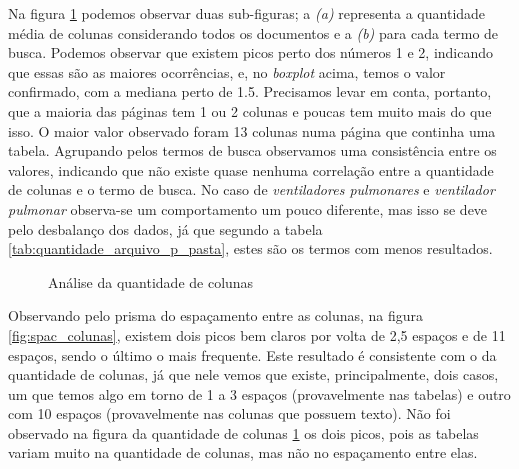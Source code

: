 \documentclass[10pt, a4paper]{article}
\begin{document}
Na figura \ref{fig:qtd_colunas} podemos observar duas sub-figuras; a \emph{(a)} representa a quantidade média de colunas considerando todos os documentos e a \emph{(b)} para cada termo de busca. Podemos observar que existem picos perto dos números 1 e 2, indicando que essas são as maiores ocorrências, e, no \textit{boxplot} acima, temos o valor confirmado, com a mediana perto de 1.5. Precisamos levar em conta, portanto, que a maioria das páginas tem 1 ou 2 colunas e poucas tem muito mais do que isso. O maior valor observado foram 13 colunas numa página que continha uma tabela. Agrupando pelos termos de busca observamos uma consistência entre os valores, indicando que não existe quase nenhuma correlação entre a quantidade de colunas e o termo de busca. No caso de \emph{ventiladores pulmonares} e \emph{ventilador pulmonar} observa-se um comportamento um pouco diferente, mas isso se deve pelo desbalanço dos dados, já que segundo a tabela \ref{tab:quantidade_arquivo_p_pasta}, estes são os termos com menos resultados.

\begin{figure}[H]
    \centering
    \hfill
    
    \hfill
    
    \hfill

    \caption{Análise da quantidade de colunas}
    \label{fig:qtd_colunas}
\end{figure}


Observando pelo prisma do espaçamento entre as colunas, na figura \ref{fig:spac_colunas}, existem dois picos bem claros por volta de 2,5 espaços e de 11 espaços, sendo o último o mais frequente. Este resultado é consistente com o da quantidade de colunas, já que nele vemos que existe, principalmente, dois casos, um que temos algo em torno de 1 a 3 espaços (provavelmente nas tabelas) e outro com 10 espaços (provavelmente nas colunas que possuem texto). Não foi observado na figura da quantidade de colunas \ref{fig:qtd_colunas} os dois picos, pois as tabelas variam muito na quantidade de colunas, mas não no espaçamento entre elas.
\end{document}
